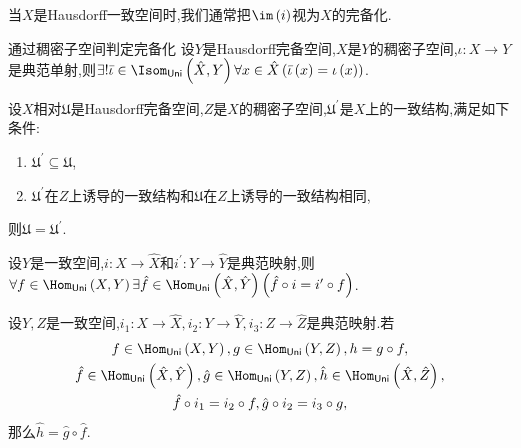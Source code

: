 \begin{remark}{}{}
	当$X$是Hausdorff一致空间时,我们通常把$\im\left(i\right)$视为$X$的完备化.
\end{remark}

\begin{proposition}{通过稠密子空间判定完备化}{}
	设$Y$是Hausdorff完备空间,$X$是$Y$的稠密子空间,$\iota:X\to Y$是典范单射,则$\exists!\bar{\iota}\in\Isom_{\mathsf{Uni}}\left(\hat{X},Y\right)\forall x\in\hat{X}\left(\bar{\iota}\left(x\right)=\iota\left(x\right)\right)$.
\end{proposition}

\begin{proposition}{}{}
	设$X$相对$\mathfrak{U}$是Hausdorff完备空间,$Z$是$X$的稠密子空间,$\mathfrak{U}^{\prime}$是$X$上的一致结构,满足如下条件:
	\begin{enumerate}
		\item $\mathfrak{U}^{\prime}\subseteq\mathfrak{U}$,
		\item $\mathfrak{U}^{\prime}$在$Z$上诱导的一致结构和$\mathfrak{U}$在$Z$上诱导的一致结构相同,
	\end{enumerate}
	则$\mathfrak{U}=\mathfrak{U}^{\prime}$.
\end{proposition}

\begin{proposition}{}{}
	设$Y$是一致空间,$i:X\to\hat{X}$和$i^{\prime}:Y\to\hat{Y}$是典范映射,则$\forall f\in\Hom_{\mathsf{Uni}}\left(X,Y\right)\exists\hat{f}\in\Hom_{\mathsf{Uni}}\left(\hat{X},\hat{Y}\right)\left(\hat{f}\circ i=i^{\prime}\circ f\right)$.
\end{proposition}

\begin{corollary}{}{}
	设$Y,Z$是一致空间,$i_{1}:X\to\hat{X},i_{2}:Y\to\hat{Y},i_{3}:Z\to\hat{Z}$是典范映射.若
	\begin{gather*}
		f\in\Hom_{\mathsf{Uni}}\left(X,Y\right),g\in\Hom_{\mathsf{Uni}}\left(Y,Z\right),h=g\circ f,\\
		\hat{f}\in\Hom_{\mathsf{Uni}}\left(\hat{X},\hat{Y}\right),\hat{g}\in\Hom_{\mathsf{Uni}}\left(Y,Z\right),\hat{h}\in\Hom_{\mathsf{Uni}}\left(\hat{X},\hat{Z}\right),\\
		\hat{f}\circ i_{1}=i_{2}\circ f,\hat{g}\circ i_{2}=i_{3}\circ g,
	\end{gather*}
	那么$\hat{h}=\hat{g}\circ\hat{f}$.
\end{corollary}

